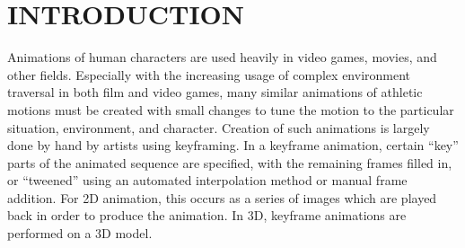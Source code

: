 
 
\chapter{INTRODUCTION}
\label{chapter:intro}

Animations of human characters are used heavily in video games, movies, and other fields.  Especially with the increasing usage of complex environment traversal in both film and video games, many similar animations of athletic motions must be created with small changes to tune the motion to the particular situation, environment, and character.  Creation of such animations is largely done by hand by artists using keyframing.  In a keyframe animation, certain ``key'' parts of the animated sequence are specified, with the remaining frames filled in, or ``tweened'' using an automated interpolation method or manual frame addition.  For 2D animation, this occurs as a series of images which are played back in order to produce the animation.  In 3D, keyframe animations are performed on a 3D model.

